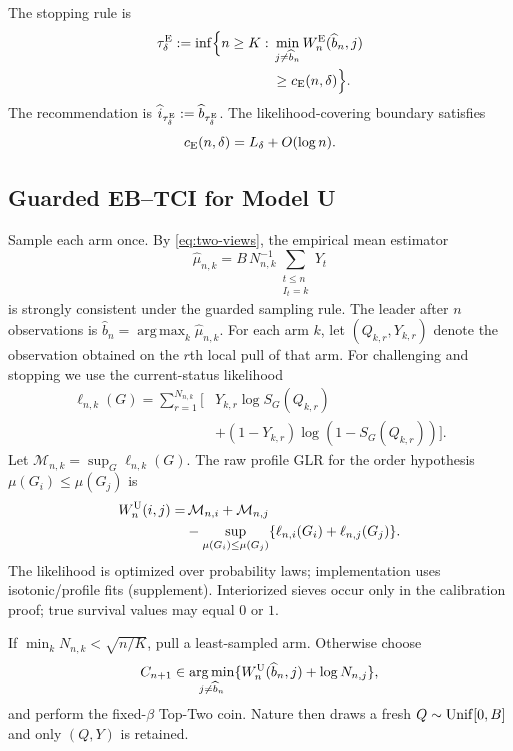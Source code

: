 \documentclass[twoside]{article}
\theoremstyle{definition}
\newcommand{\1}{\mathbf 1}
\newcommand{\argmax}{\operatorname*{arg\,max}}
\newcommand{\argmin}{\operatorname*{arg\,min}}
\newcommand{\Ldelta}{L_\delta}
\begin{document}
The stopping rule is
\begin{equation}
\begin{aligned}
\tau_\delta^{\rm E}:=\inf\Bigl\{n\ge K:\;&
\min_{j\ne\widehat b_n}W_n^{\rm E}(\widehat b_n,j)\\
&\ge c_{\rm E}(n,\delta)\Bigr\}.
\end{aligned}
\label{eq:stopE}
\end{equation}
The recommendation is
$\widehat i_{\tau_\delta^{\rm E}}:=\widehat b_{\tau_\delta^{\rm E}}$.
The likelihood-covering boundary satisfies
\[
c_{\rm E}(n,\delta)=\Ldelta+O(\log n).
\]

\subsection{Guarded EB--TCI for Model U}
Sample each arm once.  By \eqref{eq:two-views}, the empirical mean estimator
\[
\widehat\mu_{n,k}=B\,N_{n,k}^{-1}\sum_{\substack{t\le n\\ I_t=k}}Y_t
\]
is strongly consistent under the guarded sampling rule.  The leader after
$n$ observations is $\widehat b_n=\argmax_k\widehat\mu_{n,k}$.  For each arm $k$, let $(Q_{k,r},Y_{k,r})$ denote the observation obtained on the $r$th local pull of that arm.  For challenging and stopping we use the current-status likelihood
\[
\begin{split}
\ell_{n,k}(G)=\sum_{r=1}^{N_{n,k}}\big[&Y_{k,r}\log S_G(Q_{k,r})\\
&+(1-Y_{k,r})\log(1-S_G(Q_{k,r}))\big].
\end{split}
\]
Let $\mathcal M_{n,k}=\sup_G\ell_{n,k}(G)$.  The raw profile GLR for the order hypothesis $\mu(G_i)\le\mu(G_j)$ is
\begin{equation}
\begin{split}
W_n^{\rm U}(i,j)=&\,\mathcal M_{n,i}+\mathcal M_{n,j}\\
&-\sup_{\mu(G_i)\le\mu(G_j)}
\{\ell_{n,i}(G_i)+\ell_{n,j}(G_j)\}.
\end{split}
\label{eq:WU-main}
\end{equation}
The likelihood is optimized over probability laws; implementation uses
isotonic/profile fits (supplement). Interiorized sieves occur only in the
calibration proof; true survival values may equal $0$ or $1$.

If $\min_kN_{n,k}<\sqrt{n/K}$, pull a least-sampled arm.  Otherwise choose
\begin{equation}
C_{n+1}\in\argmin_{j\ne \widehat b_n}
\{W_n^{\rm U}(\widehat b_n,j)+\log N_{n,j}\},
\label{eq:challU}
\end{equation}
and perform the fixed-$\beta$ Top-Two coin.  Nature then draws a fresh $Q\sim{\rm Unif}[0,B]$ and only $(Q,Y)$ is retained.
\end{document}
